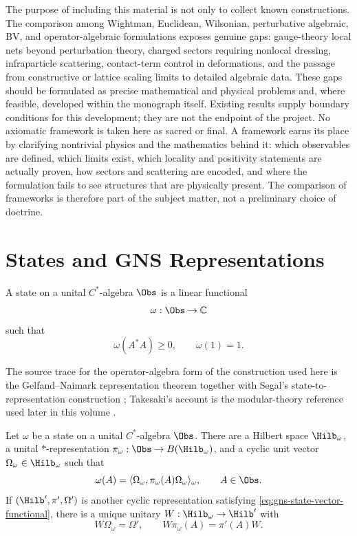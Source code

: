 The purpose of including this material is not only to collect known
constructions.  The comparison among Wightman, Euclidean, Wilsonian,
perturbative algebraic, BV, and operator-algebraic formulations exposes
genuine gaps: gauge-theory local nets beyond perturbation theory,
charged sectors requiring nonlocal dressing, infraparticle scattering,
contact-term control in deformations, and the passage from constructive or
lattice scaling limits to detailed algebraic data.  These gaps should be
formulated as precise mathematical and physical problems and, where feasible,
developed within the monograph itself.  Existing results supply boundary
conditions for this development; they are not the endpoint of the project.
No axiomatic framework is taken here as sacred or final.  A framework earns
its place by clarifying nontrivial physics and the mathematics behind it:
which observables are defined, which limits exist, which locality and
positivity statements are actually proven, how sectors and scattering are
encoded, and where the formulation fails to see structures that are physically
present.  The comparison of frameworks is therefore part of the subject
matter, not a preliminary choice of doctrine.

\section{States and GNS Representations}

\begin{definition}
\label{def:cstar-state}
A state on a unital \(C^*\)-algebra \(\Obs\) is a linear functional
\[
  \omega:\Obs\to\mathbb C
\]
such that
\[
  \omega(A^*A)\ge0,\qquad \omega(1)=1.
\]
\end{definition}

\noindent
The source trace for the operator-algebra form of the construction used here
is the Gelfand--Naimark representation theorem together with Segal's
state-to-representation construction
\cite{GelfandNaimark1943,Segal1947}; Takesaki's account is the modular-theory
reference used later in this volume \cite{Takesaki1970}.

\begin{theorem}
\label{thm:gns-construction}
Let \(\omega\) be a state on a unital \(C^*\)-algebra \(\Obs\).  There are a
Hilbert space \(\Hilb_\omega\), a unital \(*\)-representation
\(\pi_\omega:\Obs\to B(\Hilb_\omega)\), and a cyclic unit vector
\(\Omega_\omega\in\Hilb_\omega\) such that
\begin{equation}
  \omega(A)=
  \langle\Omega_\omega,\pi_\omega(A)\Omega_\omega\rangle_\omega ,
  \qquad A\in\Obs .
  \label{eq:gns-state-vector-functional}
\end{equation}
If \((\Hilb',\pi',\Omega')\) is another cyclic representation satisfying
\eqref{eq:gns-state-vector-functional}, there is a unique unitary
\(W:\Hilb_\omega\to\Hilb'\) with
\[
  W\Omega_\omega=\Omega',
  \qquad
  W\pi_\omega(A)=\pi'(A)W .
\]
\end{theorem}

